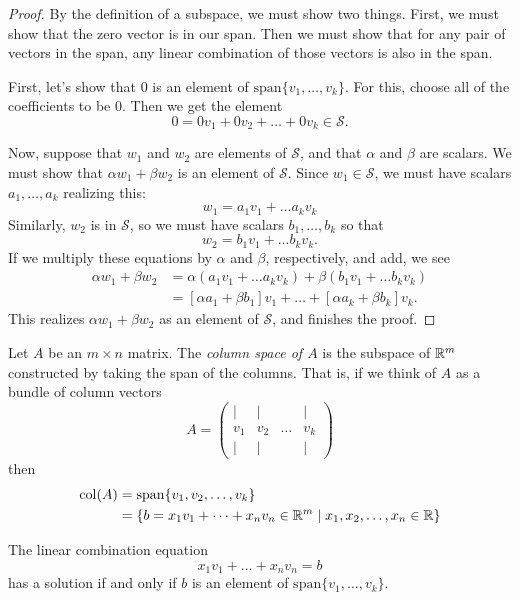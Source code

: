 \documentclass[elementsmain.tex]{subfiles}
\begin{document}
\begin{proof}
By the definition of a subspace, we must show two things. First, we must show that the zero vector is in our span. Then we must show that for any pair of vectors in the span, any linear combination of those vectors is also in the span.

First, let's show that $0$ is an element of $\mathrm{span}\{v_1, \dots, v_k\}$. For this, choose all of the coefficients to be $0$. Then we get the element
\[
0 = 0v_1 + 0 v_2 + \dots + 0 v_k  \in \mathcal{S}.
\]

Now, suppose that $w_1$ and $w_2$ are elements of $\mathcal{S}$, and that $\alpha$ and $\beta$ are scalars. We must show that $\alpha w_1 + \beta w_2$ is an element of $\mathcal{S}$. Since $w_1 \in \mathcal{S}$, we must have scalars $a_1, \ldots, a_k$ realizing this:
\[
w_1 = a_1 v_1 + \dots a_k v_k
\]
Similarly, $w_2$ is in $\mathcal{S}$, so we must have scalars $b_1, \ldots, b_k$ so that
\[
w_2 = b_1 v_1 + \dots b_k v_k.
\]
If we multiply these equations by $\alpha$ and $\beta$, respectively, and add, we see
\[
\begin{split}
\alpha w_1 + \beta w_2 & = \alpha \left(a_1 v_1 + \dots a_k v_k\right) + \beta\left( b_1 v_1 + \dots b_k v_k\right) \\
& = [\alpha a_1 + \beta b_1] v_1 + \dots + [\alpha a_k + \beta b_k] v_k.
\end{split}
\]
This realizes $\alpha w_1 + \beta w_2$ as an element of $\mathcal{S}$, and finishes the proof.
\end{proof}


\begin{definition}
Let $A$ be an $m\times n$ matrix. The \emph{column space of $A$} is the subspace of $\mathbb{R}^m$ constructed by taking the span of the columns. That is, if we think of $A$ as a bundle of column vectors
\[
A = \begin{pmatrix} | & | & & | \\ v_1 & v_2 & \dots & v_k \\ | & | &  & | \end{pmatrix}
\]
then
\[
\begin{split}
\mathrm{col}(A) &= \mathrm{span}\{v_1, v_2, \ldots, v_k\} \\
& = \left\{ b = x_1 v_1 + \dots + x_n v_n \in \mathbb{R}^m \mid x_1, x_2, \ldots, x_n \in\mathbb{R}   \right\}
\end{split}
\]
\end{definition}

\begin{theorem}
The linear combination equation 
\[
x_1 v_1 + \dots + x_n v_n = b
\]
has a solution if and only if $b$ is an element of $\mathrm{span}\{v_1, \ldots, v_k\}$.
\end{theorem}
\end{document}
